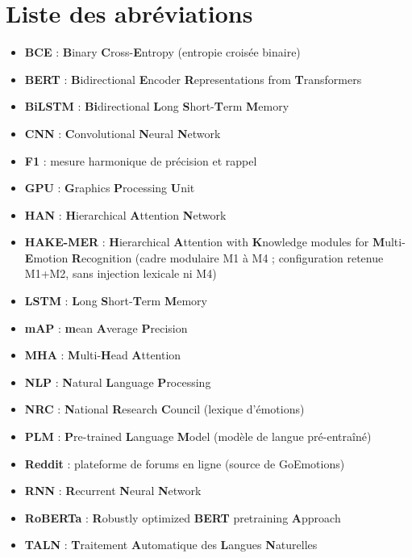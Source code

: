 \chapter*{Liste des abréviations}

\begin{itemize}[label=\textbullet]
    \item \textbf{BCE} : \textbf{B}inary \textbf{C}ross-\textbf{E}ntropy (entropie croisée binaire)
    \item \textbf{BERT} : \textbf{B}idirectional \textbf{E}ncoder \textbf{R}epresentations from \textbf{T}ransformers
    \item \textbf{BiLSTM} : \textbf{Bi}directional \textbf{L}ong \textbf{S}hort-\textbf{T}erm \textbf{M}emory
    \item \textbf{CNN} : \textbf{C}onvolutional \textbf{N}eural \textbf{N}etwork
    \item \textbf{F1} : mesure harmonique de précision et rappel
    \item \textbf{GPU} : \textbf{G}raphics \textbf{P}rocessing \textbf{U}nit
    \item \textbf{HAN} : \textbf{H}ierarchical \textbf{A}ttention \textbf{N}etwork
    \item \textbf{HAKE-MER} : \textbf{H}ierarchical \textbf{A}ttention with \textbf{K}nowledge modules for \textbf{M}ulti-\textbf{E}motion \textbf{R}ecognition (cadre modulaire M1 à M4 ; configuration retenue M1+M2, sans injection lexicale ni M4)
    \item \textbf{LSTM} : \textbf{L}ong \textbf{S}hort-\textbf{T}erm \textbf{M}emory
    \item \textbf{mAP} : \textbf{m}ean \textbf{A}verage \textbf{P}recision
    \item \textbf{MHA} : \textbf{M}ulti-\textbf{H}ead \textbf{A}ttention
    \item \textbf{NLP} : \textbf{N}atural \textbf{L}anguage \textbf{P}rocessing
    \item \textbf{NRC} : \textbf{N}ational \textbf{R}esearch \textbf{C}ouncil (lexique d'émotions)
    \item \textbf{PLM} : \textbf{P}re-trained \textbf{L}anguage \textbf{M}odel (modèle de langue pré-entraîné)
    \item \textbf{Reddit} : plateforme de forums en ligne (source de GoEmotions)
    \item \textbf{RNN} : \textbf{R}ecurrent \textbf{N}eural \textbf{N}etwork
    \item \textbf{RoBERTa} : \textbf{R}obustly optimized \textbf{BERT} pretraining \textbf{A}pproach
    \item \textbf{TALN} : \textbf{T}raitement \textbf{A}utomatique des \textbf{L}angues \textbf{N}aturelles
\end{itemize}
